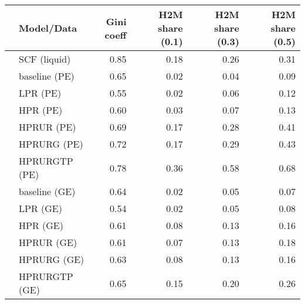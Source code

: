 \begin{tabular}{llrrrr}
	\hline \hline 
 &          Model/Data &  Gini coeff &  H2M share (0.1) &  H2M share (0.3) &  H2M share (0.5) \\
\hline \hline 
 &   SCF (liquid) &        0.85 &             0.18 &             0.26 &             0.31 \\
  &  baseline (PE) &        0.65 &             0.02 &             0.04 &             0.09 \\
  &       LPR (PE) &        0.55 &             0.02 &             0.06 &             0.12 \\
  &       HPR (PE) &        0.60 &             0.03 &             0.07 &             0.13 \\
  &     HPRUR (PE) &        0.69 &             0.17 &             0.28 &             0.41 \\
  &    HPRURG (PE) &        0.72 &             0.17 &             0.29 &             0.43 \\
  &  HPRURGTP (PE) &        0.78 &             0.36 &             0.58 &             0.68 \\
\hline 
  &  baseline (GE) &        0.64 &             0.02 &             0.05 &             0.07 \\
  &       LPR (GE) &        0.54 &             0.02 &             0.05 &             0.08 \\
  &       HPR (GE) &        0.61 &             0.08 &             0.13 &             0.16 \\
 &     HPRUR (GE) &        0.61 &             0.07 &             0.13 &             0.18 \\
 &    HPRURG (GE) &        0.63 &             0.08 &             0.13 &             0.16 \\
 &  HPRURGTP (GE) &        0.65 &             0.15 &             0.20 &             0.26 \\
\hline \hline 
\end{tabular}

